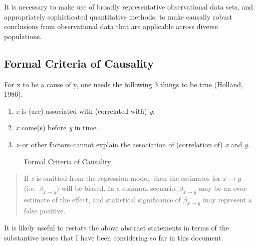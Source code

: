 \documentclass[
  letterpaper,
  DIV=11,
  numbers=noendperiod]{scrreprt}
\providecommand{\tightlist}{%
  \setlength{\itemsep}{0pt}\setlength{\parskip}{0pt}}\usepackage{longtable,booktabs,array}
\begin{document}
It is necessary to make use of broadly representative observational data
sets, and appropriately sophisticated quantitative methods, to make
causally robust conclusions from observational data that are applicable
across diverse populations.

\subsection{Formal Criteria of
Causality}\label{formal-criteria-of-causality}

For x to be a cause of y, one needs the following 3 things to be true
(Holland, 1986).

\begin{enumerate}
\def\labelenumi{\arabic{enumi}.}
\tightlist
\item
  \emph{x} is (are) associated with (correlated with) \emph{y}.
\item
  \emph{x} come(s) before \emph{y} in time.
\item
  \emph{z}--or other factors--cannot explain the association of
  (correlation of) \emph{x} and \emph{y}.
\end{enumerate}

\begin{figure}


\caption{\label{fig-causality}Formal Criteria of Causality}

\end{figure}%

\begin{quote}
If \emph{z} is omitted from the regression model, then the estimates for
\(x \rightarrow y\) (i.e.~\(\beta_{x \rightarrow y}\)) will be biased.
In a common scenario, \(\beta_{x \rightarrow y}\) may be an
over-estimate of the effect, and statistical significance of
\(\beta_{x \rightarrow y}\) may represent a false positive.
\end{quote}

It is likely useful to restate the above abstract statements in terms of
the substantive issues that I have been considering so far in this
document.
\end{document}
